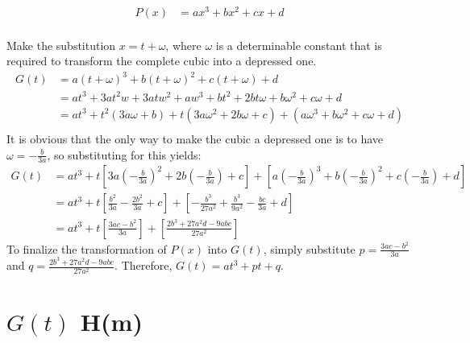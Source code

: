 \documentclass[12pt]{article}
\begin{document}
\begin{equation}
\begin{aligned}
    P(x)&=ax^3+bx^2+cx+d
\end{aligned}
\end{equation}\\
Make the substitution $x=t+\omega$, where $\omega$ is a determinable constant that is required to transform the complete cubic into a depressed one.
\begin{equation}
\begin{aligned}
    G(t)&=a(t+\omega)^3+b(t+\omega)^2+c(t+\omega)+d\\
& = at^3+3at^2w+3atw^2+aw^3+bt^2+2bt\omega+b\omega^2+c\omega+d\\
& = at^3+t^2(3a\omega+b)+t(3a\omega^2+2b\omega+c)+(a\omega^3+b\omega^2+c\omega+d)\\
\end{aligned}
\end{equation}
It is obvious that the only way to make the cubic a depressed one is to have $\omega=-\frac{b}{3a}$, so substituting for this yields:\\
\begin{equation}
\begin{aligned}
    G(t)&=at^3+t[3a(-\frac{b}{3a})^2+2b(-\frac{b}{3a})+c]+[a(-\frac{b}{3a})^3+b(-\frac{b}{3a})^2+c(-\frac{b}{3a})+d]\\
& = at^3+t[\frac{b^2}{3a}-\frac{2b^2}{3a}+c]+[-\frac{b^3}{27a^2}+\frac{b^3}{9a^2}-\frac{bc}{3a}+d]\\
& = at^3+t[\frac{3ac-b^2}{3a}]+[\frac{2b^3+27a^2d-9abc}{27a^2}]
\end{aligned}
\end{equation}
To finalize the transformation of $P(x)$ into $G(t)$, simply substitute $p=\frac{3ac-b^2}{3a}$ and $q=\frac{2b^3+27a^2d-9abc}{27a^2}$. Therefore, $G(t)=at^3+pt+q$.

\section{$G(t)$ \longrightarrow H(m)}
\end{document}
